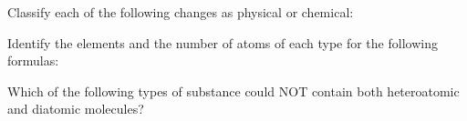 \documentclass[addpoints, 12pt]{exam}
\begin{document}
\begin{questions}

\question[5]
Classify each of the following changes as physical or chemical:


\question[5] Identify the elements and the number of atoms of each type for
  the following formulas:


\question[5] Which of the following types of substance could NOT contain both heteroatomic and diatomic molecules?



\end{questions}
\end{document}
